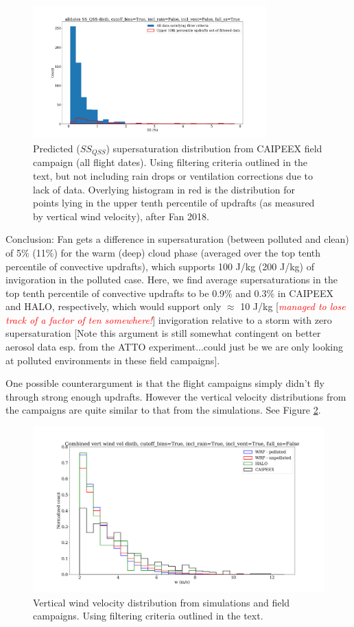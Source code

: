 \documentclass{article}
\newcommand{\klcomm}[1]{\textcolor{red}{\textit{#1}}}
\begin{document}
\begin{figure}[ht]
    \centering
    \includegraphics[width=9cm]{revcaipeex/v10_with_up10perc_ss_qss_hist_alldates_figure.png}
    \caption{Predicted ($SS_{QSS}$) supersaturation distribution from CAIPEEX field campaign (all flight dates). Using filtering criteria outlined in the text, but not including rain drops or ventilation corrections due to lack of data. Overlying histogram in red is the distribution for points lying in the upper tenth percentile of updrafts (as measured by vertical wind velocity), after Fan 2018.}
    \label{caipeexqsshist}
\end{figure}

Conclusion: Fan gets a difference in supersaturation (between polluted and clean) of 5\% (11\%) for the warm (deep) cloud phase (averaged over the top tenth percentile of convective updrafts), which supports 100 J/kg (200 J/kg) of invigoration in the polluted case. Here, we find average supersaturations in the top tenth percentile of convective updrafts to be 0.9\% and 0.3\% in CAIPEEX and HALO, respectively, which would support only $\approx$ 10 J/kg [\klcomm{managed to lose track of a factor of ten somewhere!}] invigoration relative to a storm with zero supersaturation [Note this argument is still somewhat contingent on better aerosol data esp. from the ATTO experiment...could just be we are only looking at polluted environments in these field campaigns]. 

One possible counterargument is that the flight campaigns simply didn't fly through strong enough updrafts. However the vertical velocity distributions from the campaigns are quite similar to that from the simulations. See Figure \ref{combinedwhist}. 

\begin{figure}[ht]
    \centering
    \includegraphics[width=12cm]{revmywrf/v9_combined_w_hist_figure.png}
    \caption{Vertical wind velocity distribution from simulations and field campaigns. Using filtering criteria outlined in the text.}
    \label{combinedwhist}
\end{figure}
\end{document}
